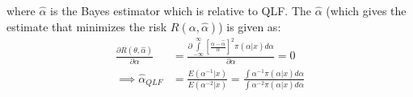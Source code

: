 \documentclass[a4paper,12pt]{report}
\begin{document}
\begin{enumerate}
	where $\hat{\alpha}$ is the Bayes estimator which is relative to QLF. The $\hat{\alpha}$ (which gives the estimate that minimizes the risk $R(\alpha,\hat{\alpha})$) is given as:
	\begin{equation}
	\begin{split}
	\frac{\partial R(\theta,\hat{\alpha})}{\partial \alpha}&=\frac{\partial\int\limits_{-\infty}^{\infty}\left[\frac{\alpha-\hat{\alpha}}{\alpha}\right]^2\pi(\alpha|x)d\alpha}{\partial\alpha}=0\\
	\implies\hat{\alpha}_{QLF}&=\frac{E(\alpha^{-1}|x)}{E(\alpha^{-2}|x)}=\frac{\int \alpha^{-1}\pi(\alpha|x)d\alpha}{\int \alpha^{-2}\pi(\alpha|x)d\alpha}
	\end{split}
	\end{equation}
	
\end{enumerate}
\end{document}
